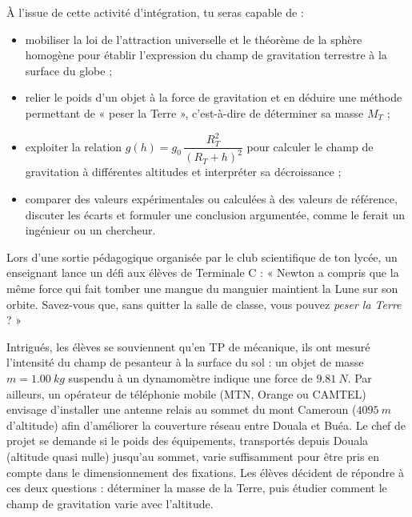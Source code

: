 \documentclass[11pt]{article}
\newcommand{\cle}[1]{{\popxbold\color{popdark}#1}}
\newcounter{popsec}
\newcounter{popsub}
\newcommand{\courssub}[1]{%
  \stepcounter{popsub}%
  \par\vspace{9pt}\noindent{\popxbold\fontsize{11.5}{13}\selectfont\color{popink}{\color{poporange}\thepopsec.\thepopsub}\hspace{6pt}#1}\par\nopagebreak\vspace{4pt}
}
\begin{document}
À l'issue de cette activité d'intégration, tu seras capable de :
\begin{itemize}
\item mobiliser la \cle{loi de l'attraction universelle} et le \cle{théorème de la sphère homogène} pour établir l'expression du champ de gravitation terrestre à la surface du globe ;
\item relier le \cle{poids} d'un objet à la force de gravitation et en déduire une méthode permettant de « peser la Terre », c'est-à-dire de déterminer sa masse $M_T$ ;
\item exploiter la relation $g(h) = g_0\,\dfrac{R_T^2}{(R_T+h)^2}$ pour calculer le champ de gravitation à différentes altitudes et interpréter sa décroissance ;
\item comparer des valeurs expérimentales ou calculées à des valeurs de référence, discuter les écarts et formuler une conclusion argumentée, comme le ferait un ingénieur ou un chercheur.
\end{itemize}

\courssub{Situation}

Lors d'une sortie pédagogique organisée par le club scientifique de ton lycée, un enseignant lance un défi aux élèves de Terminale C : « Newton a compris que la même force qui fait tomber une mangue du manguier maintient la Lune sur son orbite. Savez-vous que, sans quitter la salle de classe, vous pouvez \emph{peser la Terre} ? »

Intrigués, les élèves se souviennent qu'en TP de mécanique, ils ont mesuré l'intensité du champ de pesanteur à la surface du sol : un objet de masse $m = \SI{1,00}{kg}$ suspendu à un dynamomètre indique une force de $\SI{9,81}{N}$. Par ailleurs, un opérateur de téléphonie mobile (MTN, Orange ou CAMTEL) envisage d'installer une antenne relais au sommet du \cle{mont Cameroun} ($\SI{4095}{m}$ d'altitude) afin d'améliorer la couverture réseau entre Douala et Buéa. Le chef de projet se demande si le poids des équipements, transportés depuis Douala (altitude quasi nulle) jusqu'au sommet, varie suffisamment pour être pris en compte dans le dimensionnement des fixations. Les élèves décident de répondre à ces deux questions : déterminer la masse de la Terre, puis étudier comment le champ de gravitation varie avec l'altitude.
\end{document}
